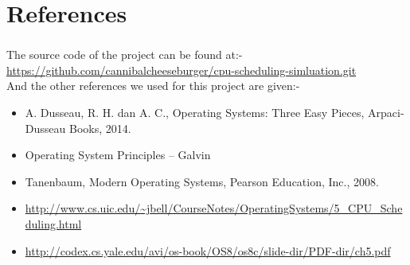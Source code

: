 \documentclass[11pt,a4paper]{report}
\begin{document}
\vskip 15cm

\chapter{References}
\vskip 1cm
{\subsection*{}
The source code of the project can be found at:-\\
	\url{https://github.com/cannibalcheeseburger/cpu-scheduling-simluation.git}\\
And the other references we used for this project are given:-
\begin{itemize}
\item 	A. Dusseau, R. H. dan A. C., Operating Systems: Three Easy Pieces, Arpaci-Dusseau Books, 2014.
\item Operating System Principles – Galvin
\item Tanenbaum, Modern Operating Systems, Pearson Education, Inc., 2008.
\item 	\url{http://www.cs.uic.edu/~jbell/CourseNotes/OperatingSystems/5_CPU_Scheduling.html}
\item \url{http://codex.cs.yale.edu/avi/os-book/OS8/os8c/slide-dir/PDF-dir/ch5.pdf}
\end{itemize}

}
\end{document}
